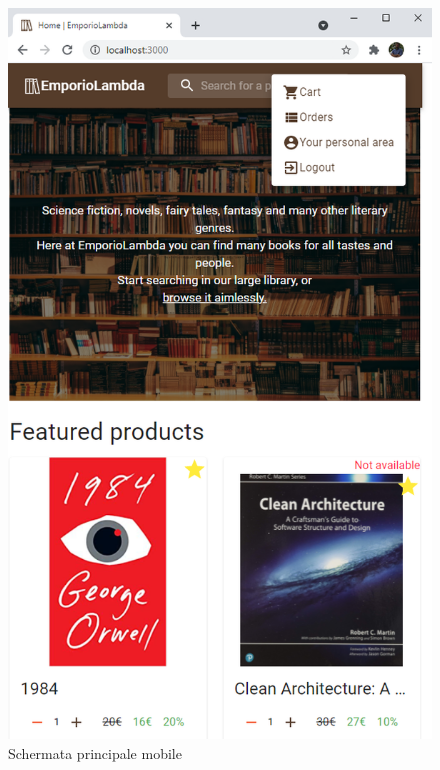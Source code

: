 \begin{figure}[h!]
	\includegraphics[scale=0.5]{Immagini/Acquirente/Home Mobile with Menu.png}
	\caption{Schermata principale mobile}
	\label{fig:HomeMobile}
\end{figure}

